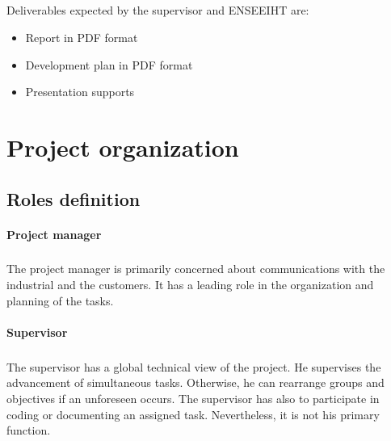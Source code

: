 \documentclass{report}
\begin{document}
\paragraph{}
\hspace{4mm}\textnormal{Deliverables expected by the supervisor and ENSEEIHT are:}

\vspace{4mm}
\begin{itemize}
\item Report in PDF format\vspace{1mm}
\item Development plan in PDF format\vspace{1mm}
\item Presentation supports\vspace{1mm}
\end{itemize}

\chapter{Project organization}

\section{Roles definition}

\subsubsection{Project manager}

\paragraph{}
\hspace{4mm}\textnormal{The project manager is primarily concerned about communications with the industrial and the customers. It has a leading role in the organization and planning of the tasks.}

\subsubsection{Supervisor}

\paragraph{}
\hspace{4mm}\textnormal{The supervisor has a global technical view of the project. He supervises the advancement of simultaneous tasks. Otherwise, he can rearrange groups and objectives if an unforeseen occurs. The supervisor has also to participate in coding or documenting an assigned task. Nevertheless, it is not his primary function.}
\end{document}
